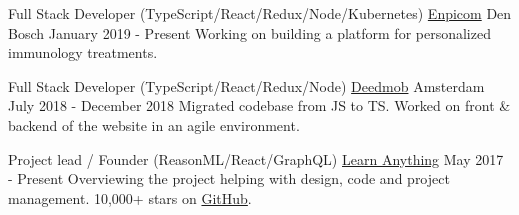 
\begin{cventries}

  \cventry
    {Full Stack Developer (TypeScript/React/Redux/Node/Kubernetes)} %
    {\href{https://www.enpicom.com}{Enpicom}} %
    {Den Bosch} %
    {January 2019 - Present} %
    {
      {Working on building a platform for personalized immunology treatments.}
    }

  \cventry
    {Full Stack Developer (TypeScript/React/Redux/Node)} %
    {\href{https://www.deedmob.com}{Deedmob}} %
    {Amsterdam} %
    {July 2018 - December 2018} %
    {
      {Migrated codebase from JS to TS. Worked on front \& backend of the website in an agile environment.}
    }

  \cventry
    {Project lead / Founder (ReasonML/React/GraphQL)} %
    {\href{https://learn-anything.xyz}{Learn Anything}} %
    {} %
    {May 2017 - Present} %
    {
      {Overviewing the project helping with design, code and project management. 10,000+ stars on \href{https://github.com/learn-anything/learn-anything}{GitHub}.}
    }

\end{cventries}

